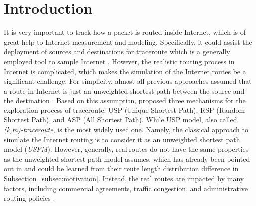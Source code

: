 \documentclass[a4paper]{llncs}
\begin{document}
\section{Introduction}
It is very important to track how a packet is routed inside Internet, which is of great help to Internet measurement and modeling. Specifically, it could assist the deployment of sources and destinations for traceroute which is a generally employed tool to sample Internet \cite{Skitter,Scamper,DIMES,iPlane,Heuristics,Rocketfuel,NTC,TraceroutePattern}. However, the realistic routing process in Internet is complicated, which makes the simulation of the Internet routes be a significant challenge. For simplicity, almost all previous approaches assumed that a route in Internet is just an unweighted shortest
path between the source and the destination \cite{TheoryAndSimulations,SamplingBiases,AccuracyScalingINETMap,RelevanceOfMassivelyQualitative,BiasTracerouteSampling}.
Based on this assumption, \cite{TheoryAndSimulations}
proposed three mechanisms for the exploration process of traceroute:
USP (Unique Shortest Path), RSP (Random Shortest Path), and ASP (All
Shortest Path). While USP model, also called
\textit{(k,m)-traceroute}, is the most widely used one. Namely, the
classical approach to simulate the Internet routing is to consider it as
an unweighted shortest path model (\textit{USPM}). However, generally, real routes do not have the same properties as the unweighted
shortest path model assumes, which has already been pointed out in
\cite{EndToEndRouting,SimulatingInternetRoute,RealSizeOfSampledNetwork} and could be learned from their route length
distribution difference in Subsection~\ref{subsec:motivation}. Instead, the real routes are impacted by many factors, including commercial agreements, traffic congestion, and administrative routing policies \cite{RouingPolicyImpact}.
\end{document}
